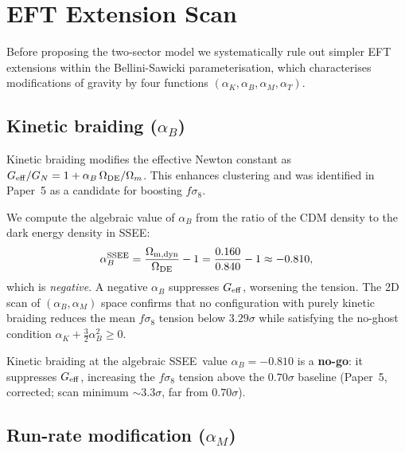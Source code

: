 \documentclass[12pt,a4paper]{article}
\newcommand{\SSEE}{\textsc{SSEE}}
\begin{document}
\section{EFT Extension Scan}
\label{sec:eft}

Before proposing the two-sector model we systematically rule out simpler EFT
extensions within the Bellini-Sawicki \citep{Bellini2015,Gubitosi2013} parameterisation,
which characterises modifications of gravity by four functions
$(\alpha_K, \alpha_B, \alpha_M, \alpha_T)$.

\subsection{Kinetic braiding ($\alpha_B$)}
\label{subsec:braiding}

Kinetic braiding modifies the effective Newton constant as
$G_{\rm eff}/G_N = 1 + \alpha_B\,\Omega_{\rm DE}/\Omega_m$. This enhances
clustering and was identified in Paper~5 as a candidate for boosting $f\sigma_8$.

We compute the algebraic value of $\alpha_B$ from the ratio of the CDM density
to the dark energy density in \SSEE:
\begin{equation}
  \alpha_B^{\rm SSEE} = \frac{\Omega_{\rm m,dyn}}{\Omega_{\rm DE}} - 1
    = \frac{0.160}{0.840} - 1 \approx -0.810,
\end{equation}
which is \emph{negative}. A negative $\alpha_B$ suppresses $G_{\rm eff}$, worsening
the tension. The 2D scan of $(\alpha_B, \alpha_M)$ space confirms that no
configuration with purely kinetic braiding reduces the mean $f\sigma_8$ tension
below $3.29\sigma$ while satisfying the no-ghost condition
$\alpha_K + \tfrac{3}{2}\alpha_B^2 \geq 0$.

\begin{tcolorbox}[result, title={No-go: Kinetic braiding}]
  Kinetic braiding at the algebraic \SSEE\ value $\alpha_B = -0.810$ is a
  \textbf{no-go}: it suppresses $G_{\rm eff}$, increasing the $f\sigma_8$
  tension above the $0.70\sigma$ baseline (Paper~5, corrected; scan minimum $\sim3.3\sigma$, far from $0.70\sigma$).
\end{tcolorbox}

\subsection{Run-rate modification ($\alpha_M$)}
\label{subsec:alphaM}
\end{document}
